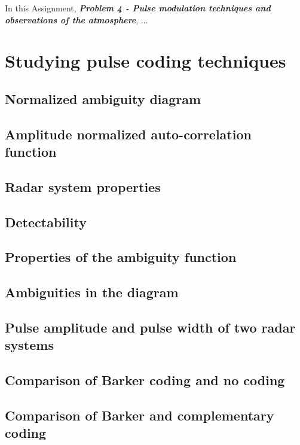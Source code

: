 

In this Assignment, \textit{\textbf{Problem 4 - Pulse modulation techniques and observations of the atmosphere}}, ...


\section{Studying pulse coding techniques}

\subsection{Normalized ambiguity diagram}

\subsection{Amplitude normalized auto-correlation function}

\subsection{Radar system properties}

\subsection{Detectability}

\subsection{Properties of the ambiguity function}

\subsection{Ambiguities in the diagram}

\subsection{Pulse amplitude and pulse width of two radar systems}

\subsection{Comparison of Barker coding and no coding}

\subsection{Comparison of Barker and complementary coding}

